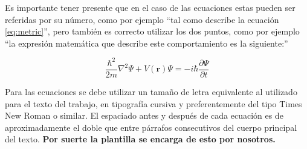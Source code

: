 Es importante tener presente que en el caso de las ecuaciones estas pueden ser referidas por su número, como por ejemplo ``tal como describe la ecuación \ref{eq:metric}'', pero también es correcto utilizar los dos puntos, como por ejemplo ``la expresión matemática que describe este comportamiento es la siguiente:''

\begin{equation}
	\label{eq:schrodinger}
	\frac{\hbar^2}{2m}\nabla^2\Psi + V(\mathbf{r})\Psi = -i\hbar \frac{\partial\Psi}{\partial t}
\end{equation}


Para las ecuaciones se debe utilizar un tamaño de letra equivalente al utilizado para el texto del trabajo, en tipografía cursiva y preferentemente del tipo Times New Roman o similar. El espaciado antes y después de cada ecuación es de aproximadamente el doble que entre párrafos consecutivos del cuerpo principal del texto. \textbf{Por suerte la plantilla se encarga de esto por nosotros.}



